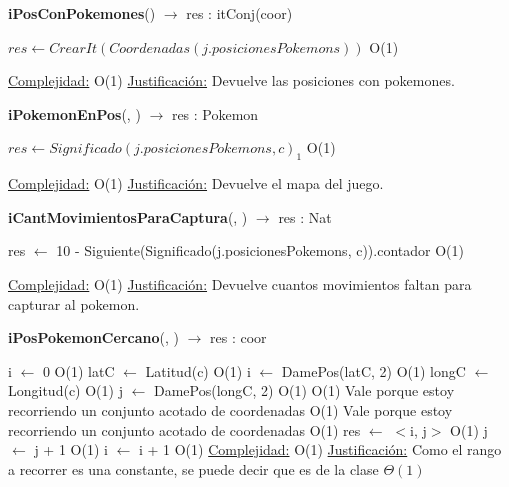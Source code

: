 \begin{algorithm}[H]{\textbf{iPosConPokemones}() $\to$ res : itConj(coor)} 
	{}
	\begin{algorithmic}
		\State $res \gets CrearIt(Coordenadas(j.posicionesPokemons)) $ \Comment O(1)
	
		\medskip
		\Statex \underline{Complejidad:} O(1)
		\Statex \underline{Justificación:} Devuelve las posiciones con pokemones.
    \end{algorithmic}
\end{algorithm}

\begin{algorithm}[H]{\textbf{iPokemonEnPos}(, ) $\to$ res : Pokemon} 
	{}
	\begin{algorithmic}
		\State $res \gets Significado(j.posicionesPokemons, c)_{1} $ \Comment O(1)
	
		\medskip
		\Statex \underline{Complejidad:} O(1)
		\Statex \underline{Justificación:} Devuelve el mapa del juego.
    \end{algorithmic}
\end{algorithm}

\begin{algorithm}[H]{\textbf{iCantMovimientosParaCaptura}(, ) $\to$ res : Nat} 
	{}
	\begin{algorithmic}
		\State res $\gets$ 10 - Siguiente(Significado(j.posicionesPokemons, c)).contador  \Comment O(1)
	
		\medskip
		\Statex \underline{Complejidad:} O(1)
		\Statex \underline{Justificación:} Devuelve cuantos movimientos faltan para capturar al pokemon.
    \end{algorithmic}
\end{algorithm}

\begin{algorithm}[H]{\textbf{iPosPokemonCercano}(, )  $\to$ res : coor} 
	{}
	\begin{algorithmic}
		\State i $\gets$ 0 \Comment O(1)
		\State latC $\gets$ Latitud(c)	\Comment O(1)
		\State i $\gets$ DamePos(latC, 2) \Comment O(1)		
		\State longC $\gets$ Longitud(c)	\Comment O(1)
		\State j $\gets$ DamePos(longC, 2) \Comment O(1)
			\Comment O(1) {Vale porque estoy recorriendo un conjunto acotado de coordenadas}
				\Comment O(1) {Vale porque estoy recorriendo un conjunto acotado de coordenadas}
					\Comment O(1)
					\State res $\gets$ $<$i, j$>$	\Comment O(1) 
				\EndIf
				\State j $\gets$ j + 1	\Comment O(1)
			\EndWhile
			\State i $\gets$ i + 1	\Comment O(1)
		\EndWhile
		\medskip
		\Statex \underline{Complejidad:} O(1)
		\Statex \underline{Justificación:} Como el rango a recorrer es una constante, se puede decir que es de la clase $\Theta(1)$ 
    \end{algorithmic}
\end{algorithm}

